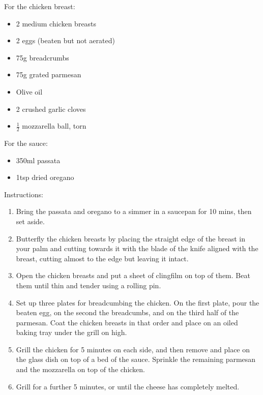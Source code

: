 \documentclass[a4paper, oneside]{book}
\begin{document}
\begin{multicols}{2}
    For the chicken breast:
    {\begin{itemize}
        \item 2 medium chicken breasts
        \item 2 eggs (beaten but not aerated)
        \item 75g breadcrumbs
        \item 75g grated parmesan
        \item Olive oil
        \item 2 crushed garlic cloves
        \item \(\frac{1}{2}\) mozzarella ball, torn
    \end{itemize}}
    For the sauce:
    {\begin{itemize}
        \item 350ml passata
        \item 1tsp dried oregano
    \end{itemize}}
Instructions:
{\begin{enumerate}
    \item 
        Bring the passata and oregano to a simmer in a saucepan for 10 mins,
        then set aside.
    \item
        Butterfly the chicken breasts by placing the straight edge of the
        breast in your palm and cutting towards it with the blade of the knife
        aligned with the breast, cutting almost to the edge but leaving it
        intact.
    \item 
        Open the chicken breasts and put a sheet of clingfilm on top of them.
        Beat them until thin and tender using a rolling pin.
    \item 
        Set up three plates for breadcumbing the chicken. On the first plate,
        pour the beaten egg, on the second the breadcumbs, and on the third
        half of the parmesan. Coat the chicken breasts in that order and place
        on an oiled baking tray under the grill on high.
    \item 
        Grill the chicken for 5 minutes on each side, and then remove and place
        on the glass dish on top of a bed of the sauce. Sprinkle the remaining
        parmesan and the mozzarella on top of the chicken.
    \item 
        Grill for a further 5 minutes, or until the cheese has completely
        melted.
\end{enumerate}}

\end{multicols}
\end{document}
